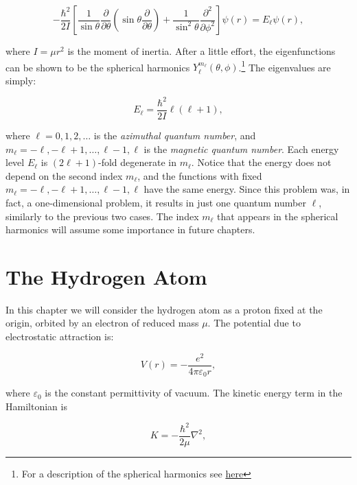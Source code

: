 \documentclass[
  9pt,
]{extbook}
\theoremstyle{definition}
\theoremstyle{definition}
\theoremstyle{definition}
\theoremstyle{remark}
\begin{document}
\begin{equation}
- \frac{\hbar^2}{2I} \left[ \frac{1}{\sin \theta}
\frac{\partial}{\partial \theta} \left(\sin\theta\frac{\partial}{\partial \theta} \right) + \frac{1}{\sin^2 \theta} \frac{\partial^2}{\partial \phi^2} \right] \psi(r) = E_{\ell} \psi(r),
\label{eq:RR1}
\end{equation}

where \(I=\mu r^2\) is the moment of inertia. After a little effort, the eigenfunctions can be shown to be the spherical harmonics \(Y_{\ell}^{m_{\ell}}(\theta, \phi)\).\footnote{For a description of the spherical harmonics see \href{https://en.wikipedia.org/wiki/Spherical_harmonic}{here}} The eigenvalues are simply:

\begin{equation}
E_{\ell} = \frac{\hbar^2}{2I} \ell(\ell+1),
\label{eq:RR2}
\end{equation}

where \(\ell=0,1,2,\ldots\) is the \emph{azimuthal quantum number}, and \(m_{\ell}=-\ell, -\ell+1, \ldots, \ell-1, \ell\) is the \emph{magnetic quantum number}. Each energy level \(E_{\ell}\) is \((2\ell+1)\)-fold degenerate in \(m_{\ell}\). Notice that the energy does not depend on the second index \(m_{\ell}\), and the functions with fixed \(m_{\ell}=-\ell,-\ell+1,\dots,\ell-1,\ell\) have the same energy. Since this problem was, in fact, a one-dimensional problem, it results in just one quantum number \(\ell\), similarly to the previous two cases. The index \(m_{\ell}\) that appears in the spherical harmonics will assume some importance in future chapters.

\hypertarget{Hydrogen}{%
\chapter{The Hydrogen Atom}\label{Hydrogen}}

In this chapter we will consider the hydrogen atom as a proton fixed at the origin, orbited by an electron of reduced mass \(\mu\). The potential due to electrostatic attraction is:

\begin{equation}
V(r) = - \frac{e^2}{4 \pi \varepsilon_0 r},
\label{eq:HA1}
\end{equation}

where \(\varepsilon_0\) is the constant permittivity of vacuum.
The kinetic energy term in the Hamiltonian is

\begin{equation}
K = - \frac{\hbar^2}{2 \mu} \nabla^2,
\label{eq:HA2}
\end{equation}
\end{document}
